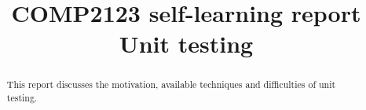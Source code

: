 \documentclass{article}
\title{COMP2123 self-learning report \\
Unit testing}
\begin{document}

\maketitle
\begin{abstract}
This report discusses the motivation, available techniques and difficulties of unit testing.
\end{abstract}
\newpage

{\hypersetup{hidelinks}
	\tableofcontents
}
\newpage










\end{document}
